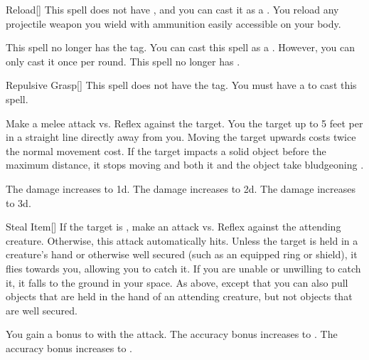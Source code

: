 \lowercase{\hypertarget{spell:Reload}{}}\label{spell:Reload}
\begin{freeability}[Rank 2]{\hypertarget{spell:Reload}{Reload}}[]
This spell does not have , and you can cast it as a .
You reload any projectile weapon you wield with ammunition easily accessible on your body.

\rankline
{} This spell no longer has the  tag.
 You can cast this spell as a .
However, you can only cast it once per round.
 This spell no longer has .
\end{freeability}
\vspace{0.25em}



\lowercase{\hypertarget{spell:Repulsive Grasp}{}}\label{spell:Repulsive Grasp}
\begin{freeability}[Rank 2]{\hypertarget{spell:Repulsive Grasp}{Repulsive Grasp}}[]
This spell does not have the  tag.
You must have a  to cast this spell.

Make a melee attack vs. Reflex against the target.
\hit You  the target up to 5 feet per  in a straight line directly away from you.
Moving the target upwards costs twice the normal movement cost.
If the target impacts a solid object before the maximum distance, it stops moving and both it and the object take bludgeoning .

\rankline
{} The damage increases to  \plus1d.
 The damage increases to  \plus2d.
 The damage increases to  \plus3d.
\end{freeability}
\vspace{0.25em}



\lowercase{\hypertarget{spell:Steal Item}{}}\label{spell:Steal Item}
\begin{freeability}[Rank 2]{\hypertarget{spell:Steal Item}{Steal Item}}[]
If the target is , make an attack vs. Reflex against the attending creature.
Otherwise, this attack automatically hits.
\hit Unless the target is held in a creature's hand or otherwise well secured (such as an equipped ring or shield), it flies towards you, allowing you to catch it.
If you are unable or unwilling to catch it, it falls to the ground in your space.
\crit As above, except that you can also pull objects that are held in the hand of an attending creature, but not objects that are well secured.

\rankline
{} You gain a  bonus to  with the attack.
 The accuracy bonus increases to .
 The accuracy bonus increases to .
\end{freeability}
\vspace{0.25em}



